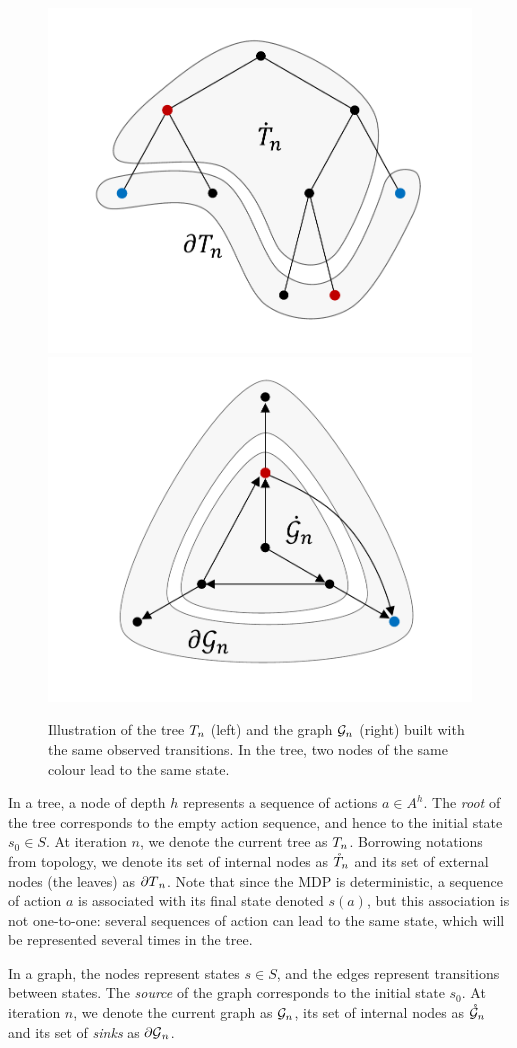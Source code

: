 \documentclass[runningheads]{llncs}
\begin{document}
\begin{figure}[tp]
	\centering
	\includegraphics[trim={1.8cm 1.2cm 1.9cm 1.2cm}, clip,width=0.44\linewidth]{img/tree_1}
	\hfill
	\includegraphics[trim={1.8cm 1.2cm 1.9cm 0.9cm}, clip,width=0.44\linewidth]{img/graph_1}
	\caption{Illustration of the tree $T_n$ (left) and the graph $\mathcal{G}_n$ (right) built with the same observed transitions. In the tree, two nodes of the same colour lead to the same state.}
	\label{fig:structures}
\end{figure}

In a tree, a node of depth $h$ represents a sequence of actions $a\in A^h$. The \textit{root} of the tree corresponds to the empty action sequence, and hence to the initial state $s_0\in S$. At iteration $n$, we denote the current tree as $T_n$. Borrowing notations from topology, we denote its set of internal nodes as $\mathring{T}_n$ and its set of external nodes (the leaves) as ${\partial T}_n$. Note that since the MDP is deterministic, a sequence of action $a$ is associated with its final state denoted $s(a)$, but this association is not one-to-one: several sequences of action can lead to the same state, which will be represented several times in the tree.

In a graph, the nodes represent states $s\in S$, and the edges represent transitions between states. The \textit{source} of the graph corresponds to the initial state $s_0$. At iteration $n$, we denote the current graph as $\mathcal{G}_n$, its set of internal nodes as $\mathring{\mathcal{G}}_n$ and its set of \textit{sinks} as ${\partial \mathcal{G}}_n$.
\end{document}
